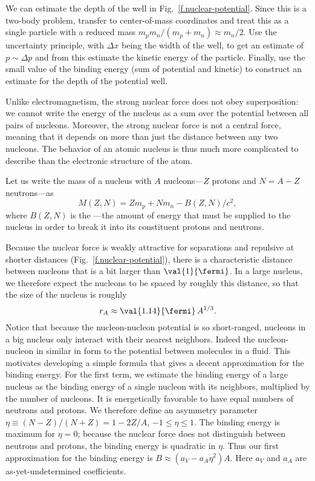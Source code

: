 \begin{exercisebox}
We can estimate the depth of the well in Fig.~\ref{f.nuclear-potential}. Since this is a two-body problem, transfer to center-of-mass coordinates and treat this as a single particle with a reduced mass $m_{p}m_{n}/(m_{p}+m_{n}) \approx m_{n}/2$. Use the uncertainty principle, with $\Delta x$ being the width of the well, to get an estimate of $p\sim\Delta p$ and from this estimate the kinetic energy of the particle. Finally, use the small value of the binding energy (sum of potential and kinetic) to construct an estimate for the depth of the potential well.
\end{exercisebox}

Unlike electromagnetism, the strong nuclear force does not obey superposition: we cannot write the energy of the nucleus as a sum over the potential between all pairs of nucleons. Moreover, the strong nuclear force is not a central force, meaning that it depends on more than just the distance between any two nucleons. The behavior of an atomic nucleus is thus much more complicated to describe than the electronic structure of the atom.

 Let us write the mass of a nucleus with $A$ nucleons---$Z$ protons and $N=A-Z$ neutrons---as
\[
	M(Z,N) = Zm_{p} + Nm_{n} - B(Z,N)/c^{2},
\]
where $B(Z,N)$ is the ---the amount of energy that must be supplied to the nucleus in order to break it into its constituent protons and neutrons.

Because the nuclear force is weakly attractive for separations  and repulsive at shorter distances (Fig.~\ref{f.nuclear-potential}), there is a characteristic distance between nucleons that is a bit larger than $\val{1}{\fermi}$. In a large nucleus, we therefore expect the nucleons to be spaced by roughly this distance, so that the size of the nucleus is roughly
\[
	r_{A} \approx \val{1.14}{\fermi}\,A^{1/3}.
\]
Notice that because the nucleon-nucleon potential is so short-ranged, nucleons in a big nucleus only interact with their nearest neighbors. Indeed the nucleon-nucleon in similar in form to the potential between molecules in a fluid. This motivates developing a simple formula that gives a decent approximation for the binding energy. For the first term, we estimate the binding energy of a large nucleus as the binding energy of a single nucleon with its neighbors, multiplied by the number of nucleons. It is energetically favorable to have equal numbers of neutrons and protons. We therefore define an asymmetry parameter $\eta \equiv (N-Z)/(N+Z) = 1-2Z/A$, $-1\le\eta\le1$. The binding energy is maximum for $\eta = 0$; because the nuclear force does not distinguish between neutrons and protons, the binding energy is quadratic in $\eta$. Thus our first approximation for the binding energy is $B \approx (a_{V} - a_{A}\eta^{2}) A$. Here $a_{V}$ and $a_{A}$ are as-yet-undetermined coefficients.

